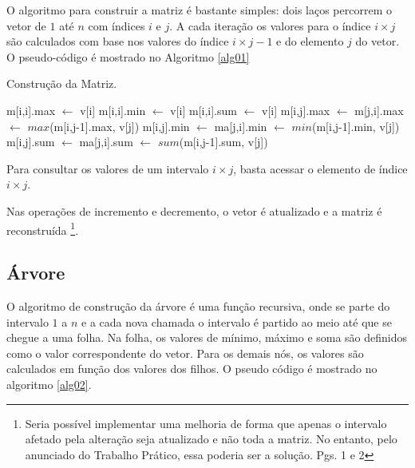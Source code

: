\documentclass[10pt,a4paper]{article}
\begin{document}
    O algoritmo para construir a matriz é bastante simples: dois laços percorrem o vetor de $1$ até $n$ com índices $i$ e $j$. A cada iteração os valores para o índice $i \times j$ são calculados com base nos valores do índice $i \times j-1$ e do elemento $j$ do vetor. O pseudo-código é mostrado no Algoritmo \ref{alg01}

    \begin{algorithm}[H]
    	\caption{Construção da Matriz.}
    	\label{alg01}

    	\begin{algorithmic}[1]
    			\State m[i,i].max $\gets$ v[i]
    			\State m[i,i].min $\gets$ v[i]
				\State m[i,i].sum $\gets$ v[i]
					\State m[i,j].max $\gets$ m[j,i].max $\gets$ $max$(m[i,j-1].max, v[j])
					\State m[i,j].min $\gets$ ma[j,i].min $\gets$ $min$(m[i,j-1].min, v[j])
					\State m[i,j].sum $\gets$ ma[j,i].sum $\gets$ $sum$(m[i,j-1].sum, v[j])
				\EndFor
    		\EndFor
		\end{algorithmic}
        
    \end{algorithm}

    Para consultar os valores de um intervalo $i \times j$, basta acessar o elemento de índice $i \times j$.

    Nas operações de incremento e decremento, o vetor é atualizado e a matriz é reconstruída 
    \footnote{Seria possível implementar uma melhoria de forma que apenas o intervalo afetado pela alteração seja atualizado e não toda a matriz. No entanto, pelo anunciado do Trabalho Prático, essa poderia ser a solução. Pgs. 1 e 2}.

    \subsection{Árvore}

    O algoritmo de construção da árvore é uma função recursiva, onde se parte do intervalo $1$ a $n$ e a cada nova chamada o intervalo é partido ao meio até que se chegue a uma folha. Na folha, os valores de mínimo, máximo e soma são definidos como o valor correspondente do vetor. Para os demais nós, os valores são calculados em função dos valores dos filhos. O pseudo código é mostrado no algoritmo \ref{alg02}.
\end{document}
